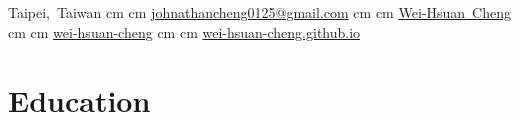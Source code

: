 \documentclass[10pt, letterpaper]{article}
\newenvironment{header}{
    \setlength{\topsep}{0pt}\par\kern\topsep
}{
    \par\kern\topsep
} %
\let\hrefWithoutArrow\href
\renewcommand{\href}[2]{\hrefWithoutArrow{#1}{\ifthenelse{\equal{#2}{}}{ }{#2 }\raisebox{.15ex}{\footnotesize \faExternalLink*}}}
\begin{document}
\begin{minipage}[t]{0.8\textwidth}
\begin{header}
        \mbox{{\color{black}\footnotesize\faMapMarker*}\hspace*{0.13cm}Taipei, Taiwan}%
         cm%
        \AND%
         cm%
        \mbox{\hrefWithoutArrow{mailto:johnathancheng0125@gmail.com}{\color{black}{\footnotesize\faEnvelope[regular]}\hspace*{0.13cm}johnathancheng0125@gmail.com}}%
         cm%
        \AND%
         cm%
        \mbox{\hrefWithoutArrow{https://www.linkedin.com/in/wei-hsuan-cheng-582486264/}{\color{black}{\footnotesize\faLinkedinIn}\hspace*{0.13cm}Wei-Hsuan Cheng}}%
         cm%
        \AND%
         cm%
        \mbox{\hrefWithoutArrow{https://github.com/wei-hsuan-cheng}{\color{black}{\footnotesize\faGithub}\hspace*{0.13cm}wei-hsuan-cheng}}%
         cm%
        \AND%
         cm%
        \mbox{\hrefWithoutArrow{https://wei-hsuan-cheng.github.io}{\color{black}{\footnotesize\faGlobe}\hspace*{0.13cm}wei-hsuan-cheng.github.io}}%
        \end{header}
    \end{minipage}

    \vspace{0.1 cm}


    \section{Education}
        
\end{document}
